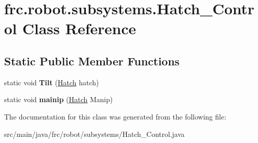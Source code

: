\hypertarget{classfrc_1_1robot_1_1subsystems_1_1_hatch___control}{}\section{frc.\+robot.\+subsystems.\+Hatch\+\_\+\+Control Class Reference}
\label{classfrc_1_1robot_1_1subsystems_1_1_hatch___control}
\subsection*{Static Public Member Functions}
\begin{DoxyCompactItemize}
\item 
\mbox{\label{classfrc_1_1robot_1_1subsystems_1_1_hatch___control_a10439efd71fc486d24b95364d70dcde3}} 
static void {\bfseries Tilt} (\hyperlink{enumfrc_1_1robot_1_1_enums_1_1_hatch}{Hatch} hatch)
\item 
\mbox{\label{classfrc_1_1robot_1_1subsystems_1_1_hatch___control_a902c47bda22ebf4421953aafbc76128e}} 
static void {\bfseries mainip} (\hyperlink{enumfrc_1_1robot_1_1_enums_1_1_hatch}{Hatch} Manip)
\end{DoxyCompactItemize}


The documentation for this class was generated from the following file\+:\begin{DoxyCompactItemize}
\item 
src/main/java/frc/robot/subsystems/Hatch\+\_\+\+Control.\+java\end{DoxyCompactItemize}
